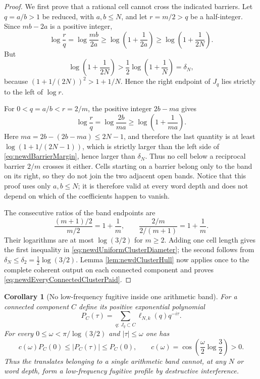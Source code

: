 \documentclass[11pt]{amsart}
\newtheorem{corollary}[theorem]{Corollary}
\theoremstyle{definition}
\theoremstyle{remark}
\begin{document}
\begin{proof}
We first prove that a rational cell cannot cross the indicated barriers.
Let $q=a/b>1$ be reduced, with $a,b\leq N$, and let $r=m/2>q$ be a
half-integer.  Since $mb-2a$ is a positive integer,
\[
 \log\frac rq
 =\log\frac{mb}{2a}
 \geq\log\left(1+\frac1{2a}\right)
 \geq\log\left(1+\frac1{2N}\right).
\]
But
\begin{equation}\label{eq:newdBarrierMargin}
 \log\left(1+\frac1{2N}\right)
 >\frac12\log\left(1+\frac1N\right)=\delta_N,
\end{equation}
because $(1+1/(2N))^2>1+1/N$.  Hence the right endpoint of $J_q$ lies
strictly to the left of $\log r$.

For $0<q=a/b<r=2/m$, the positive integer $2b-ma$ gives
\[
 \log\frac rq
 =\log\frac{2b}{ma}
 \geq\log\left(1+\frac1{ma}\right).
\]
Here $ma=2b-(2b-ma)\leq2N-1$, and therefore the last quantity is at least
$\log(1+1/(2N-1))$, which is strictly larger than the left side of
\eqref{eq:newdBarrierMargin}, hence larger than $\delta_N$.  Thus no cell
below a reciprocal barrier $2/m$ crosses it either.  Cells starting on a
barrier belong only to the band on its right, so they do not join the two
adjacent open bands.  Notice that this proof uses only $a,b\leq N$; it is
therefore valid at every word depth and does not depend on which of the
coefficients happen to vanish.

The consecutive ratios of the band endpoints are
\[
 \frac{(m+1)/2}{m/2}=1+\frac1m,
 \qquad
 \frac{2/m}{2/(m+1)}=1+\frac1m.
\]
Their logarithms are at most $\log(3/2)$ for $m\geq2$.  Adding one cell
length gives the first inequality in
\eqref{eq:newdUniformClusterDiameter}; the second follows from
$\delta_N\leq\delta_2=\tfrac12\log(3/2)$.  Lemma
\ref{lem:newdClusterHull} now applies once to the complete coherent output
on each connected component and proves
\eqref{eq:newdEveryConnectedClusterPaid}.
\end{proof}

\begin{corollary}[No low-frequency fugitive inside one arithmetic band]
\label{cor:newdBandCoherence}
For a connected component $C$ define its positive exponential polynomial
\[
 P_C(\tau)=\sum_{q:\,J_q\subset C}\ell_{N,k}(q)q^{-i\tau}.
\]
For every $0\leq\omega<\pi/\log(3/2)$ and $|\tau|\leq\omega$ one has
\begin{equation}\label{eq:newdBandCoherence}
 c(\omega)P_C(0)\leq |P_C(\tau)|\leq P_C(0),
 \qquad
 c(\omega)=
 \cos\!\left(\frac{\omega}{2}\log\frac32\right)>0.
\end{equation}
Thus the translates belonging to a single arithmetic band cannot, at any
$N$ or word depth, form a low-frequency fugitive profile by destructive
interference.
\end{corollary}
\end{document}
